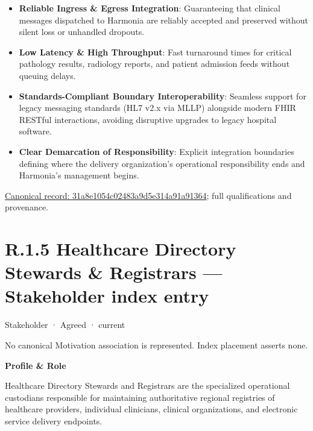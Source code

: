 \begin{itemize}


\item \textbf{Reliable Ingress \& Egress Integration}: Guaranteeing that clinical messages dispatched to Harmonia are reliably accepted and preserved without silent loss or unhandled dropouts.

\item \textbf{Low Latency \& High Throughput}: Fast turnaround times for critical pathology results, radiology reports, and patient admission feeds without queuing delays.

\item \textbf{Standards-Compliant Boundary Interoperability}: Seamless support for legacy messaging standards (HL7 v2.x via MLLP) alongside modern FHIR RESTful interactions, avoiding disruptive upgrades to legacy hospital software.

\item \textbf{Clear Demarcation of Responsibility}: Explicit integration boundaries defining where the delivery organization's operational responsibility ends and Harmonia's management begins.

\end{itemize}

{\footnotesize \href{../../../../../../../continuum/motivation/stakeholder/31a8e1054c02483a9d5e314a91a91364.md}{Canonical record: 31a8e1054c02483a9d5e314a91a91364}; full qualifications and provenance.}\par
\section*{R.1.5 Healthcare Directory Stewards \& Registrars — Stakeholder index entry}
\label{navigation:R.1.5}

\label{element:1c8e2c898a28436693cf2ae69776e125}
{\small Stakeholder · Agreed · current}\par
No canonical Motivation association is represented. Index placement asserts none.\par

\par\medskip\textbf{Profile \& Role}\par


Healthcare Directory Stewards and Registrars are the specialized operational custodians responsible for maintaining authoritative regional registries of healthcare providers, individual clinicians, clinical organizations, and electronic service delivery endpoints.




